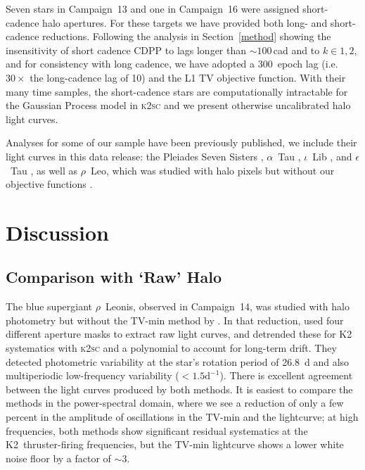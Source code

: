 \documentclass[modern]{aastex62}
\begin{document}
Seven stars in Campaign~13 and one in Campaign~16 were assigned short-cadence halo apertures. For these targets we have provided both long- and short-cadence reductions. Following the analysis in Section~\ref{method} showing the insensitivity of short cadence CDPP to lags longer than $\sim 100$\,cad and to $k \in {1,2}$, and for consistency with long cadence, we have adopted a 300~epoch lag (i.e. $30 \times$ the long-cadence lag of 10) and the L1 TV objective function. With their many time samples, the short-cadence stars are computationally intractable for the Gaussian Process model in \textsc{k2sc} and we present otherwise uncalibrated halo light curves.



Analyses for some of our sample have been previously published, we include their light curves in this data release: the Pleiades Seven Sisters \citep{White2017}, $\alpha$~Tau \citep[Aldebaran;][]{Farr2018}, $\iota$~Lib \citep{Buysschaert2018}, and $\epsilon$~Tau \citep{Arentoft2019}, as well as $\rho$~Leo, which was studied with halo pixels but without our objective functions \citep{Aerts2018}.


\section{Discussion}
\label{sec:discussion}

\subsection{Comparison with `Raw' Halo}
\label{raw}

The blue supergiant $\rho$~Leonis, observed in Campaign~14, was studied with halo photometry but without the TV-min method by \citet{Aerts2018}. In that reduction, \citet{Aerts2018} used four different aperture masks to extract raw light curves, and detrended these for K2 systematics with \textsc{k2sc} and a polynomial to account for long-term drift. They detected photometric variability at the star's rotation period of 26.8~d and also multiperiodic low-frequency variability ($<1.5 \text{d}^{-1}$). There is excellent agreement between the light curves produced by both methods. It is easiest to compare the methods in the power-spectral domain, where we see a reduction of only a few percent in the amplitude of oscillations in the TV-min and the \citet{Aerts2018} lightcurve; at high frequencies, both methods show significant residual systematics at the K2~thruster-firing frequencies, but the TV-min lightcurve shows a lower white noise floor by a factor of $\sim 3$. 
\end{document}
